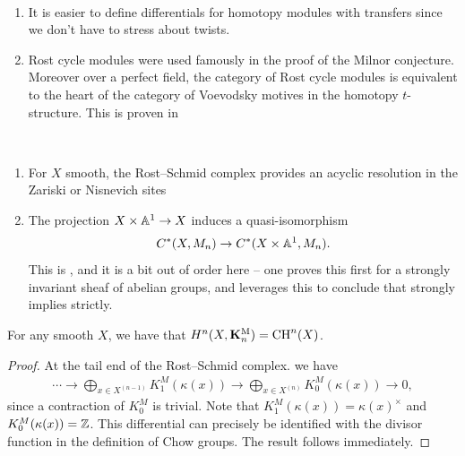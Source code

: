 \documentclass[11pt,openany]{book}
\providecommand{\KM}{\mathbf{K}^\mathrm{M}}
\begin{document}
\begin{remark} $\ $
\begin{enumerate}
    \item It is easier to define differentials for homotopy modules with transfers since we don't have to stress about twists.
    \item Rost cycle modules were used famously in the proof of the Milnor conjecture. Moreover over a perfect field, the category of Rost cycle modules is equivalent to the heart of the category of Voevodsky motives in the homotopy $t$-structure. This is proven in \cite[Theorem 4.5]{Deglise-motifs-mixtes}
\end{enumerate}
\end{remark}

\begin{theorem} \,
\begin{enumerate}
    \item For $X$ smooth, the Rost--Schmid complex provides an acyclic resolution in the Zariski or Nisnevich sites
    \item The projection $X \times \mathbb{A}^1 \to X$ induces a quasi-isomorphism
    \begin{align*}
        C^\ast(X,M_n) \to C^\ast(X \times \mathbb{A}^1,M_n).
    \end{align*}
    This is \cite[5.38]{Morel}, and it is a bit out of order here -- one proves this first for a strongly invariant sheaf of abelian groups, and leverages this to conclude that strongly implies strictly.
\end{enumerate}

\end{theorem}




\begin{theorem} For any smooth $X$, we have that $H^n(X,\KM_n) = \CH^n(X)$.
\end{theorem}
\begin{proof} At the tail end of the Rost--Schmid complex. we have
\begin{align*}
    \cdots \to \bigoplus_{x\in X^{(n-1)}} K_1^M (\kappa(x)) \to \bigoplus_{x\in X^{(n)}} K_0^M(\kappa(x)) \to 0,
\end{align*}
since a contraction of $K_0^M$ is trivial. Note that $K_1^M(\kappa(x)) = \kappa(x)^\times$ and $K_0^M(\kappa(x)) = \mathbb{Z}$. This differential can precisely be identified with the divisor function in the definition of Chow groups. The result follows immediately.
\end{proof}
\end{document}
